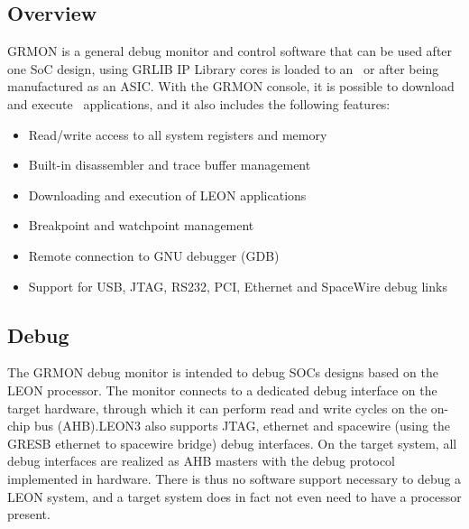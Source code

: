 \subsection{Overview}
 GRMON \cite{GRMON} is a general debug monitor and control software that can be used after one SoC design, using GRLIB IP Library cores is loaded to an \fpga~or after being manufactured as an ASIC.  With the GRMON console, it is possible to download and execute \leon~applications, and it  also includes the following features:
\begin{itemize}
 \item Read/write access to all system registers and memory
 \item Built-in disassembler and trace buffer management
 \item Downloading and execution of LEON applications
 \item Breakpoint and watchpoint management
 \item Remote connection to GNU debugger (GDB)
 \item Support for USB, JTAG, RS232, PCI, Ethernet and SpaceWire debug links
\end{itemize}

\subsection{Debug}

The GRMON debug monitor is intended to debug SOCs designs based on the LEON processor. The monitor connects to a dedicated debug interface on the target hardware, through which it can perform read and write cycles on the on-chip bus (AHB).LEON3 also supports JTAG, ethernet and spacewire (using the GRESB ethernet to spacewire bridge) debug interfaces. On the target system, all debug interfaces are realized as AHB masters with the debug protocol implemented in hardware. There is thus no software support necessary to debug a LEON system, and a target system does in fact not even need to have a processor present.

